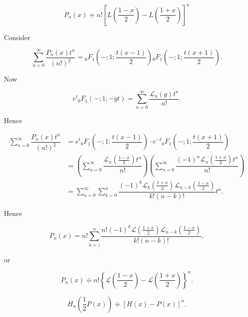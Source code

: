 \begin{problem}\label{problem3chapter15}
$$P_n(x) \doteqdot n! \left[ L \left( \dfrac{1-x}{2} \right) - L \left( \dfrac{1+x}{2} \right) \right]^n$$
\end{problem}
\begin{solution}
Consider

$$\displaystyle\sum_{n=0}^{\infty} \dfrac{P_n(x)t^n}{(n!)^2} = {}_0F_1 \left(-;1;\dfrac{t(x-1)}{2} \right) {}_0F_1\left(-;1;\dfrac{t(x+1)}{2} \right).$$

Now

$$e^t {}_0F_1(-;1;-yt) = \displaystyle\sum_{n=0}^{\infty} \dfrac{\mathscr{L}_n(y)t^n}{n!}.$$

Hence

$$\begin{array}{ll}
\displaystyle\sum_{n=0}^{\infty} \dfrac{P_n(x) t^n}{(n!)^2} &= e^t {}_0F_1 \left(-;1;\dfrac{t(x-1)}{2} \right) \cdot e^{-t} {}_0F_1 \left( -;1; \dfrac{t(x+1)}{2} \right) \\
&= \left( \displaystyle\sum_{n=0}^{\infty} \dfrac{\mathscr{L}_n \left( \frac{1-x}{2} \right) t^n}{n!} \right) \left( \displaystyle\sum_{n=0}^{\infty} \dfrac{(-1)^n \mathscr{L}_n \left( \frac{1+x}{2} \right) t^n}{n!} \right) \\
&= \displaystyle\sum_{n=0}^{\infty} \displaystyle\sum_{k=0}^n \dfrac{(-1)^k \mathscr{L}_k(\frac{1+x}{2})\mathscr{L}_{n-k} \left( \frac{1-x}{2} \right)}{k! (n-k)!} t^n.
\end{array}$$

Hence 

$$P_n(x) = n! \displaystyle\sum_{k=)}^n \dfrac{n! (-1)^k \mathscr{L}(\frac{1+x}{2})\mathscr{L}_{n-k}(\frac{1-x}{2})}{k!(n-k)!},$$

or

$$P_n(x) \doteqdot n! \left\{ \mathscr{L} \left( \dfrac{1-x}{2} \right) - \mathscr{L} \left( \dfrac{1+x}{2} \right) \right\}^n.$$
\end{solution}
\begin{problem}\label{problem4chapter15}
$$H_n \left( \dfrac{1}{2}P(x) \right) \doteqdot [H(x) - P(x)]^n.$$
\end{problem}
